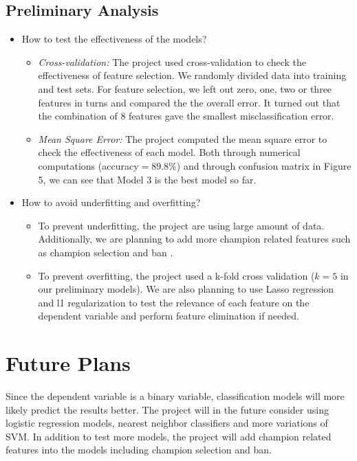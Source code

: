 \documentclass[10.5pt]{article}
\begin{document}
\subsection{Preliminary Analysis}
 \begin{itemize}
   \item  How to test the effectiveness of the models?
   \begin{itemize}
     \item \textit{Cross-validation:} The project used cross-validation to check the effectiveness of feature selection. We randomly divided data into training and test sets. For feature selection, we left out zero, one, two or three features in turns and compared the the overall error. It turned out that the combination of 8 features gave the smallest misclassification error.
     \item \textit{Mean Square Error:} The project computed the mean square error to check the effectiveness of each model. Both through numerical computations (accuracy$=89.8 \% $) and through confusion matrix in Figure 5, we can see that Model 3 is the best model so far.
   \end{itemize}
   \item How to avoid underfitting and overfitting?
   \begin{itemize}
     \item To prevent underfitting, the project are using large amount of data. Additionally, we are planning to add more champion related features such as champion selection and ban .
     \item To prevent overfitting, the project used a k-fold cross validation ($k=5$ in our preliminary models). We are also planning to use Lasso regression and l1 regularization to test the relevance of each feature on the dependent variable and perform feature elimination if needed.
   \end{itemize}
 \end{itemize}

\section{Future Plans}
Since the dependent variable is a binary variable, classification models will more likely predict the results better. The project will in the future consider using logistic regression models, nearest neighbor classifiers and more variations of SVM. In addition to test more models, the project will add champion related features into the models including champion selection and ban.
\end{document}
